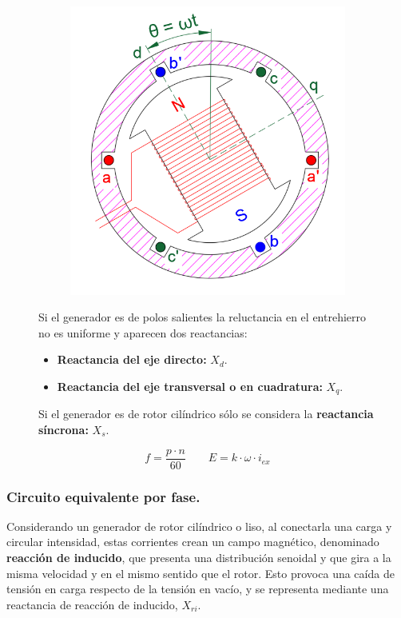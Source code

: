 				
				\begin{figure}[H]
					\begin{minipage}{0.5\textwidth}
						\begin{figure}[H]
							\centering
							\includegraphics[width=0.7\linewidth]{res/tema6/ejes_dq}
							\label{fig:ejesdq}
						\end{figure}
					\end{minipage}
					\begin{minipage}{0.5\textwidth}
						Si el generador es de polos salientes la reluctancia en el entrehierro no es uniforme y aparecen dos reactancias:
						\begin{itemize}
							\item \textbf{Reactancia del eje directo:} $X_d$.
							\item \textbf{Reactancia del eje transversal o en cuadratura:} $X_q$.
						\end{itemize}
						Si el generador es de rotor cilíndrico sólo se considera la \textbf{reactancia síncrona:} $X_s$.
						
						\[f = \dfrac{p\cdot n}{60} \qquad E = k\cdot \omega \cdot i_{ex}\]
					\end{minipage}
				\end{figure}
			
			\subsubsection{Circuito equivalente por fase.}
				Considerando un generador de rotor cilíndrico o liso, al conectarla una carga y circular intensidad, estas corrientes crean un campo magnético, denominado \textbf{reacción de inducido}, que presenta una distribución senoidal y que gira a la misma velocidad y en el mismo sentido que el rotor. Esto provoca una caída de tensión en carga respecto de la tensión en vacío, y se representa mediante una reactancia de reacción de inducido, $X_{ri}$.
				
